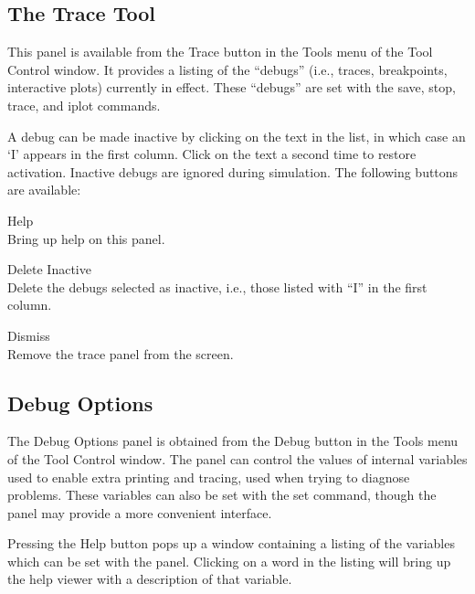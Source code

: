 \subsection{The Trace Tool}
\label{tracepanel}

This panel is available from the {\cb Trace} button in the {\cb Tools}
menu of the {\cb Tool Control} window.  It provides a listing of the
``debugs'' (i.e., traces, breakpoints, interactive plots) currently in
effect.  These ``debugs'' are set with the {\cb save}, {\cb stop},
{\cb trace}, and {\cb iplot} commands.

A debug can be made inactive by clicking on the text in the list, in
which case an `I' appears in the first column.  Click on the text a
second time to restore activation.  Inactive debugs are ignored during
simulation.  The following buttons are available:

\begin{description}
\item{\cb Help}\\
    Bring up help on this panel.
\item{\cb Delete Inactive}\\
    Delete the debugs selected as inactive, i.e., those listed with
    ``I'' in the first column.
\item{\cb Dismiss}\\
    Remove the trace panel from the screen.
\end{description}

\subsection{Debug Options}
\label{dbgopts}

The {\cb Debug Options} panel is obtained from the {\cb Debug} button
in the {\cb Tools} menu of the {\cb Tool Control} window.  The panel
can control the values of internal variables used to enable extra
printing and tracing, used when trying to diagnose problems.  These
variables can also be set with the {\cb set} command, though the panel
may provide a more convenient interface.

Pressing the {\cb Help} button pops up a window containing a listing
of the variables which can be set with the panel.  Clicking on a word
in the listing will bring up the help viewer with a description of
that variable.

